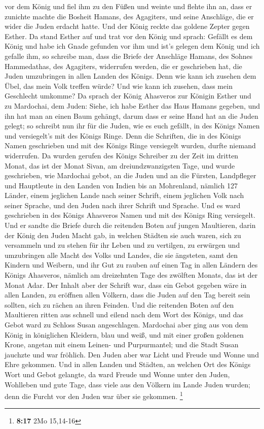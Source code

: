 vor dem König und fiel ihm zu den Füßen und weinte und flehte ihn an,
dass er zunichte machte die Bosheit Hamans, des Agagiters, und seine
Anschläge, die er wider die Juden erdacht hatte.  Und der
König reckte das goldene Zepter gegen Esther. Da stand Esther auf und
trat vor den König  und sprach: Gefällt es dem König und
habe ich Gnade gefunden vor ihm und ist's gelegen dem König und ich
gefalle ihm, so schreibe man, dass die Briefe der Anschläge Hamans, des
Sohnes Hammedathas, des Agagiters, widerrufen werden, die er geschrieben
hat, die Juden umzubringen in allen Landen des Königs. 
Denn wie kann ich zusehen dem Übel, das mein Volk treffen würde? Und wie
kann ich zusehen, dass mein Geschlecht umkomme?  Da sprach
der König Ahasveros zur Königin Esther und zu Mardochai, dem Juden:
Siehe, ich habe Esther das Haus Hamans gegeben, und ihn hat man an einen
Baum gehängt, darum dass er seine Hand hat an die Juden gelegt;
 so schreibt nun ihr für die Juden, wie es euch gefällt,
in des Königs Namen und versiegelt's mit des Königs Ringe. Denn die
Schriften, die in des Königs Namen geschrieben und mit des Königs Ringe
versiegelt wurden, durfte niemand widerrufen.  Da wurden
gerufen des Königs Schreiber zu der Zeit im dritten Monat, das ist der
Monat Sivan, am dreiundzwanzigsten Tage, und wurde geschrieben, wie
Mardochai gebot, an die Juden und an die Fürsten, Landpfleger und
Hauptleute in den Landen von Indien bis an Mohrenland, nämlich 127
Länder, einem jeglichen Lande nach seiner Schrift, einem jeglichen Volk
nach seiner Sprache, und den Juden nach ihrer Schrift und Sprache.
 Und es ward geschrieben in des Königs Ahasveros Namen
und mit des Königs Ring versiegelt. Und er sandte die Briefe durch die
reitenden Boten auf jungen Maultieren,  darin der König
den Juden Macht gab, in welchen Städten sie auch waren, sich zu
versammeln und zu stehen für ihr Leben und zu vertilgen, zu erwürgen und
umzubringen alle Macht des Volks und Landes, die sie ängsteten, samt den
Kindern und Weibern, und ihr Gut zu rauben  auf einen Tag
in allen Ländern des Königs Ahasveros, nämlich am dreizehnten Tage des
zwölften Monats, das ist der Monat Adar.  Der Inhalt aber
der Schrift war, dass ein Gebot gegeben wäre in allen Landen, zu
eröffnen allen Völkern, dass die Juden auf den Tag bereit sein sollten,
sich zu rächen an ihren Feinden.  Und die reitenden Boten
auf den Maultieren ritten aus schnell und eilend nach dem Wort des
Königs, und das Gebot ward zu Schloss Susan angeschlagen.
 Mardochai aber ging aus von dem König in königlichen
Kleidern, blau und weiß, und mit einer großen goldenen Krone, angetan
mit einem Leinen- und Purpurmantel; und die Stadt Susan jauchzte und war
fröhlich.  Den Juden aber war Licht und Freude und Wonne
und Ehre gekommen.  Und in allen Landen und Städten, an
welchen Ort des Königs Wort und Gebot gelangte, da ward Freude und Wonne
unter den Juden, Wohlleben und gute Tage, dass viele aus den Völkern im
Lande Juden wurden; denn die Furcht vor den Juden war über sie gekommen.
\footnote{\textbf{8:17} 2Mo 15,14-16}

